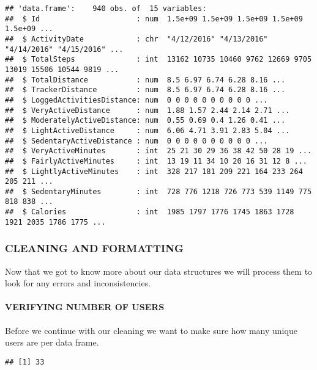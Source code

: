 \documentclass[
]{article}
\newenvironment{Shaded}{\begin{snugshade}}{\end{snugshade}}
\newcommand{\FunctionTok}[1]{\textcolor[rgb]{0.13,0.29,0.53}{\textbf{#1}}}
\newcommand{\NormalTok}[1]{#1}
\newcommand{\SpecialCharTok}[1]{\textcolor[rgb]{0.81,0.36,0.00}{\textbf{#1}}}
\begin{document}
\begin{verbatim}
## 'data.frame':    940 obs. of  15 variables:
##  $ Id                      : num  1.5e+09 1.5e+09 1.5e+09 1.5e+09 1.5e+09 ...
##  $ ActivityDate            : chr  "4/12/2016" "4/13/2016" "4/14/2016" "4/15/2016" ...
##  $ TotalSteps              : int  13162 10735 10460 9762 12669 9705 13019 15506 10544 9819 ...
##  $ TotalDistance           : num  8.5 6.97 6.74 6.28 8.16 ...
##  $ TrackerDistance         : num  8.5 6.97 6.74 6.28 8.16 ...
##  $ LoggedActivitiesDistance: num  0 0 0 0 0 0 0 0 0 0 ...
##  $ VeryActiveDistance      : num  1.88 1.57 2.44 2.14 2.71 ...
##  $ ModeratelyActiveDistance: num  0.55 0.69 0.4 1.26 0.41 ...
##  $ LightActiveDistance     : num  6.06 4.71 3.91 2.83 5.04 ...
##  $ SedentaryActiveDistance : num  0 0 0 0 0 0 0 0 0 0 ...
##  $ VeryActiveMinutes       : int  25 21 30 29 36 38 42 50 28 19 ...
##  $ FairlyActiveMinutes     : int  13 19 11 34 10 20 16 31 12 8 ...
##  $ LightlyActiveMinutes    : int  328 217 181 209 221 164 233 264 205 211 ...
##  $ SedentaryMinutes        : int  728 776 1218 726 773 539 1149 775 818 838 ...
##  $ Calories                : int  1985 1797 1776 1745 1863 1728 1921 2035 1786 1775 ...
\end{verbatim}

\hypertarget{cleaning-and-formatting}{%
\subsubsection{CLEANING AND FORMATTING}\label{cleaning-and-formatting}}

Now that we got to know more about our data structures we will process
them to look for any errors and inconsistencies.

\hypertarget{verifying-number-of-users}{%
\paragraph{VERIFYING NUMBER OF USERS}\label{verifying-number-of-users}}

Before we continue with our cleaning we want to make sure how many
unique users are per data frame.

\begin{Shaded}
\end{Shaded}

\begin{verbatim}
## [1] 33
\end{verbatim}
\end{document}

